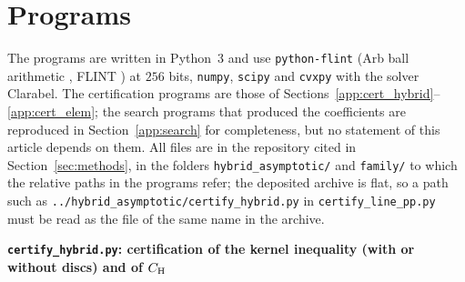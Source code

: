 \documentclass[11pt,reqno]{amsart}
\makeatletter
\let\CG@origcite\cite
\renewcommand*{\cite}[2][]{\def\CG@citekey{#2}%
  \ifx\relax#1\relax\CG@origcite{#2}\else\CG@origcite[#1]{#2}\fi}
\numberwithin{equation}{section}
\theoremstyle{definition}
\theoremstyle{remark}
\newcommand{\appsub}[1]{\par\medskip\noindent\textbf{#1}\par\nobreak\smallskip}
\makeatother
\begin{document}
\section{Programs}\label{app:code}
The programs are written in Python~3 and use \texttt{python-flint} (Arb ball arithmetic \cite{Johansson2017}, FLINT \cite{FLINT}) at $256$ bits, \texttt{numpy}, \texttt{scipy} and \texttt{cvxpy} with the solver Clarabel. The certification programs are those of Sections~\ref{app:cert_hybrid}--\ref{app:cert_elem}; the search programs that produced the coefficients are reproduced in Section~\ref{app:search} for completeness, but no statement of this article depends on them. All files are in the repository cited in Section~\ref{sec:methods}, in the folders \texttt{hybrid\_asymptotic/} and \texttt{family/} to which the relative paths in the programs refer; the deposited archive is flat, so a path such as \texttt{../hybrid\_asymptotic/certify\_hybrid.py} in \texttt{certify\_line\_pp.py} must be read as the file of the same name in the archive.
\appsub{\texttt{certify\_hybrid.py}: certification of the kernel inequality (with or without discs) and of $C_{\rm H}$}
\label{app:cert_hybrid}
\end{document}
